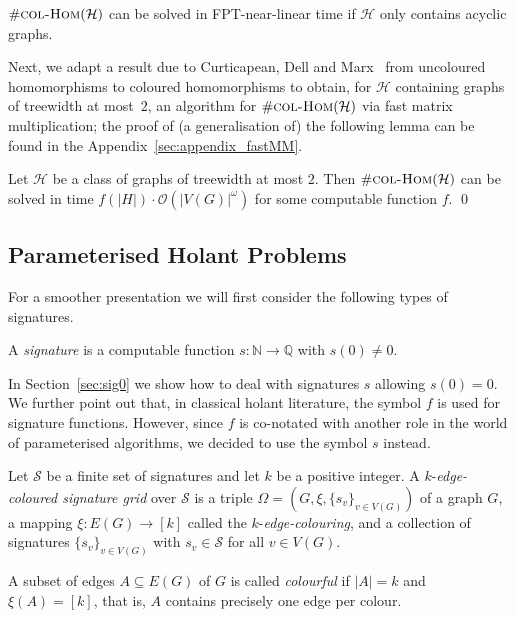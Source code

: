 \documentclass[authorcolumns,numberwithinsect]{no-lipics-v2022}
\newcommand{\colhomsprob}{\text{\sc{col-Hom}}}
\begin{document}
\begin{fact}\label{fact:colhoms_lintime}
    $\#\colhomsprob(\mathcal{H})$ can be solved in FPT-near-linear time if $\mathcal{H}$ only contains acyclic graphs.
\end{fact}

Next, we adapt a result due to Curticapean, Dell and Marx~\cite[Theorem 1.7]{CurticapeanDM17} from uncoloured homomorphisms to coloured homomorphisms to obtain, for $\mathcal{H}$ containing graphs of treewidth at most~$2$, an algorithm for $\#\colhomsprob(\mathcal{H})$ via fast matrix multiplication; the proof of (a generalisation of) the following lemma can be found in the Appendix~\ref{sec:appendix_fastMM}.

\begin{lemma}\label{lem:colhom_matrix_multi}
    Let $\mathcal{H}$ be a class of graphs of treewidth at most $2$. Then $\#\colhomsprob(\mathcal{H})$ can be solved in time $f(|H|)\cdot \mathcal{O}(|V(G)|^{\omega})$ for some computable function $f$. \qed
\end{lemma}



\subsection{Parameterised Holant Problems}
For a smoother presentation we will first consider the following types of signatures.
\begin{definition}
    A \emph{signature} is a computable function $s:\mathbb{N} \to \mathbb{Q}$ with $s(0)\neq 0$.
\end{definition}
In Section~\ref{sec:sig0} we show how to deal with signatures $s$ allowing $s(0)=0$. We further point out that, in classical holant literature, the symbol $f$ is used for signature functions. However, since $f$ is co-notated with another role in the world of parameterised algorithms, we decided to use the symbol $s$ instead. 

\begin{definition}
    Let $\mathcal{S}$ be a finite set of signatures and let $k$ be a positive integer.
    A $k$-\emph{edge-coloured signature grid} over $\mathcal{S}$ is a triple $\Omega=(G,\xi,\{s_v\}_{v\in V(G)})$ of a graph $G$, a mapping $\xi:E(G) \to [k]$ called the $k$-\emph{edge-colouring}, and a collection of signatures $\{s_v\}_{v\in V(G)}$ with $s_v \in \mathcal{S}$ for all $v\in V(G)$.

    A subset of edges $A\subseteq E(G)$ of $G$ is called \emph{colourful} if $|A|=k$ and $\xi(A)=[k]$, that is, $A$ contains precisely one edge per colour.
\end{definition}
\end{document}
